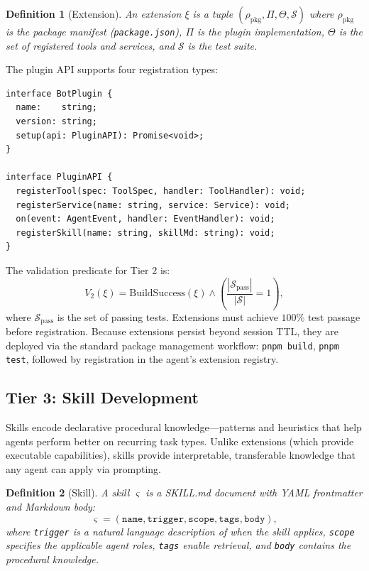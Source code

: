 \documentclass[11pt]{article}
\newtheorem{definition}{Definition}
\begin{document}
\begin{definition}[Extension]
An \emph{extension} $\xi$ is a tuple $(\rho_{\text{pkg}}, \Pi, \Theta, \mathcal{S})$
where $\rho_{\text{pkg}}$ is the package manifest (\texttt{package.json}),
$\Pi$ is the plugin implementation, $\Theta$ is the set of registered tools and
services, and $\mathcal{S}$ is the test suite.
\end{definition}

The plugin API supports four registration types:

\begin{verbatim}
interface BotPlugin {
  name:    string;
  version: string;
  setup(api: PluginAPI): Promise<void>;
}

interface PluginAPI {
  registerTool(spec: ToolSpec, handler: ToolHandler): void;
  registerService(name: string, service: Service): void;
  on(event: AgentEvent, handler: EventHandler): void;
  registerSkill(name: string, skillMd: string): void;
}
\end{verbatim}

The validation predicate for Tier 2 is:
\begin{equation}
    V_2(\xi) = \text{BuildSuccess}(\xi) \wedge \left(\frac{|\mathcal{S}_{\text{pass}}|}{|\mathcal{S}|} = 1\right),
\end{equation}
where $\mathcal{S}_{\text{pass}}$ is the set of passing tests. Extensions must
achieve $100\%$ test passage before registration. Because extensions persist
beyond session TTL, they are deployed via the standard package management
workflow: \texttt{pnpm build}, \texttt{pnpm test}, followed by registration in
the agent's extension registry.

\subsection{Tier 3: Skill Development}
\label{sec:tier3}

Skills encode declarative procedural knowledge---patterns and heuristics that
help agents perform better on recurring task types. Unlike extensions (which
provide executable capabilities), skills provide interpretable, transferable
knowledge that any agent can apply via prompting.

\begin{definition}[Skill]
A \emph{skill} $\varsigma$ is a SKILL.md document with YAML frontmatter and
Markdown body:
\begin{equation}
    \varsigma = \left(\texttt{name}, \texttt{trigger}, \texttt{scope},
    \texttt{tags}, \texttt{body}\right),
\end{equation}
where \texttt{trigger} is a natural language description of when the skill
applies, \texttt{scope} specifies the applicable agent roles, \texttt{tags}
enable retrieval, and \texttt{body} contains the procedural knowledge.
\end{definition}
\end{document}
